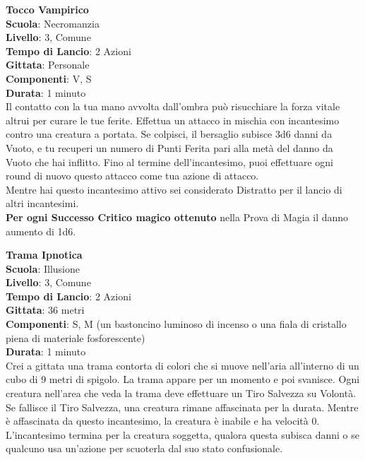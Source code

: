 \begin{multicols}{2}
\medskip\textbf{Tocco Vampirico}\\
\textbf{Scuola}: Necromanzia\\
\textbf{Livello}: 3, Comune\\
\textbf{Tempo di Lancio}: 2 Azioni\\
\textbf{Gittata}: Personale\\
\textbf{Componenti}: V, S\\
\textbf{Durata}: 1 minuto \\
Il contatto con la tua mano avvolta dall'ombra può risucchiare la forza vitale altrui per curare le tue ferite. Effettua un attacco in mischia con incantesimo contro una creatura a portata. Se colpisci, il bersaglio subisce 3d6 danni da Vuoto, e tu recuperi un numero di Punti Ferita pari alla metà del danno da Vuoto che hai inflitto. Fino al termine dell'incantesimo, puoi effettuare ogni round di nuovo questo attacco come tua azione di attacco.\\
Mentre hai questo incantesimo attivo sei considerato Distratto per il lancio di altri incantesimi.\\
\textbf{Per ogni Successo Critico magico ottenuto} nella Prova di Magia il danno aumento di 1d6.

\medskip\textbf{Trama Ipnotica}\\
\textbf{Scuola}: Illusione\\
\textbf{Livello}: 3, Comune\\
\textbf{Tempo di Lancio}: 2 Azioni\\
\textbf{Gittata}: 36 metri\\
\textbf{Componenti}: S, M (un bastoncino luminoso di incenso o una fiala di cristallo piena di materiale fosforescente)\\
\textbf{Durata}: 1 minuto\\
Crei a gittata una trama contorta di colori che si muove nell'aria all'interno di un cubo di 9 metri di spigolo. La trama appare per un momento e poi svanisce. Ogni creatura nell'area che veda la trama deve effettuare un Tiro Salvezza su Volontà. Se fallisce il Tiro Salvezza, una creatura rimane affascinata per la durata. Mentre è affascinata da questo incantesimo, la creatura è inabile e ha velocità 0. L'incantesimo termina per la creatura soggetta, qualora questa subisca danni o se qualcuno usa un'azione per scuoterla dal suo stato confusionale.


\end{multicols}
